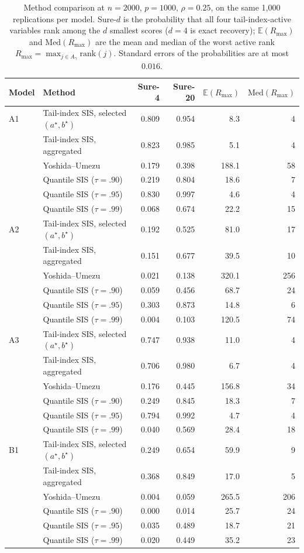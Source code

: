 \documentclass[bj,authoryear]{imsart}
\theoremstyle{plain}
\newcommand{\A}{A}\newcommand{\I}{I_\varepsilon}
\begin{document}
\begin{table}[t]
\centering
\caption{Method comparison at $n=2000$, $p=1000$, $\rho=0.25$, on the same 1{,}000 replications per model. Sure-$d$ is the probability that all four tail-index-active variables rank among the $d$ smallest scores ($d=4$ is exact recovery); $\mathbb{E}(R_{\max})$ and $\mathrm{Med}(R_{\max})$ are the mean and median of the worst active rank $R_{\max}=\max_{j\in\A_\gamma}\mathrm{rank}(j)$. Standard errors of the probabilities are at most $0.016$.}
\label{tab:cmp1000}
\begin{tabular}{llrrrr}
\toprule
Model & Method & Sure-4 & Sure-20 & $\mathbb{E}(R_{\max})$ & $\mathrm{Med}(R_{\max})$\\
\midrule
A1 & Tail-index SIS, selected $(a^\star,b^\star)$ & 0.809 & 0.954 & 8.3 & 4\\
 & Tail-index SIS, aggregated & 0.823 & 0.985 & 5.1 & 4\\
 & Yoshida--Umezu & 0.179 & 0.398 & 188.1 & 58\\
 & Quantile SIS ($\tau=.90$) & 0.219 & 0.804 & 18.6 & 7\\
 & Quantile SIS ($\tau=.95$) & 0.830 & 0.997 & 4.6 & 4\\
 & Quantile SIS ($\tau=.99$) & 0.068 & 0.674 & 22.2 & 15\\
\addlinespace
A2 & Tail-index SIS, selected $(a^\star,b^\star)$ & 0.192 & 0.525 & 81.0 & 17\\
 & Tail-index SIS, aggregated & 0.151 & 0.677 & 39.5 & 10\\
 & Yoshida--Umezu & 0.021 & 0.138 & 320.1 & 256\\
 & Quantile SIS ($\tau=.90$) & 0.059 & 0.456 & 68.7 & 24\\
 & Quantile SIS ($\tau=.95$) & 0.303 & 0.873 & 14.8 & 6\\
 & Quantile SIS ($\tau=.99$) & 0.004 & 0.103 & 120.5 & 74\\
\addlinespace
A3 & Tail-index SIS, selected $(a^\star,b^\star)$ & 0.747 & 0.938 & 11.0 & 4\\
 & Tail-index SIS, aggregated & 0.706 & 0.980 & 6.7 & 4\\
 & Yoshida--Umezu & 0.176 & 0.445 & 156.8 & 34\\
 & Quantile SIS ($\tau=.90$) & 0.249 & 0.845 & 18.3 & 7\\
 & Quantile SIS ($\tau=.95$) & 0.794 & 0.992 & 4.7 & 4\\
 & Quantile SIS ($\tau=.99$) & 0.040 & 0.569 & 28.4 & 18\\
\addlinespace
B1 & Tail-index SIS, selected $(a^\star,b^\star)$ & 0.249 & 0.654 & 59.9 & 9\\
 & Tail-index SIS, aggregated & 0.368 & 0.849 & 17.0 & 5\\
 & Yoshida--Umezu & 0.004 & 0.059 & 265.5 & 206\\
 & Quantile SIS ($\tau=.90$) & 0.000 & 0.014 & 25.7 & 24\\
 & Quantile SIS ($\tau=.95$) & 0.035 & 0.489 & 18.7 & 21\\
 & Quantile SIS ($\tau=.99$) & 0.020 & 0.449 & 35.2 & 23\\
\bottomrule
\end{tabular}
\end{table}
\end{document}
